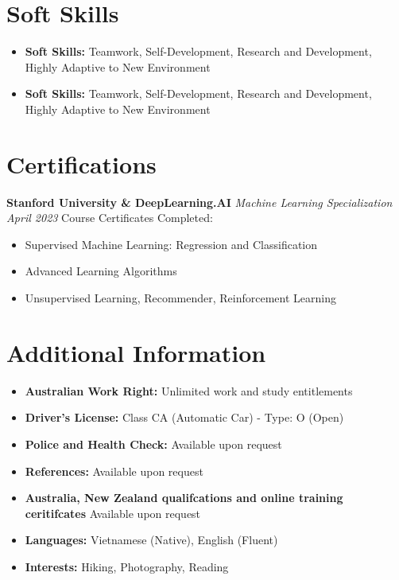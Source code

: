 \documentclass[a4paper,12pt]{article}
\begin{document}
\section*{Soft Skills}
\begin{itemize}
    \item \textbf{Soft Skills:} Teamwork, Self-Development, Research and Development, Highly Adaptive to New Environment
    \item \textbf{Soft Skills:} Teamwork, Self-Development, Research and Development, Highly Adaptive to New Environment
\end{itemize}

\section*{Certifications}
\noindent
\textbf{Stanford University \& DeepLearning.AI} \newline
\textit{Machine Learning Specialization} \hfill \textit{April 2023} \newline
Course Certificates Completed:
\begin{itemize}
    \item Supervised Machine Learning: Regression and Classification
    \item Advanced Learning Algorithms
    \item Unsupervised Learning, Recommender, Reinforcement Learning
\end{itemize}

\section*{Additional Information}
\begin{itemize}
    \item \textbf{Australian Work Right:} Unlimited work and study entitlements
    \item \textbf{Driver's License:} Class CA (Automatic Car) - Type: O (Open)
    \item \textbf{Police and Health Check:} Available upon request
    \item \textbf{References:} Available upon request
    \item \textbf{Australia, New Zealand qualifcations and online training ceritifcates} Available upon request
    \item \textbf{Languages:} Vietnamese (Native), English (Fluent)
    \item \textbf{Interests:} Hiking, Photography, Reading
\end{itemize}
\end{document}
